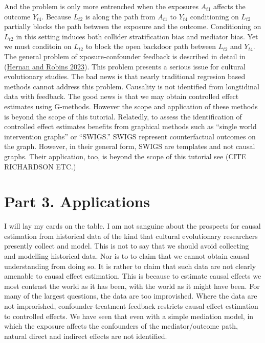 \documentclass[
  singlecolumn]{report}
\begin{document}
And the problem is only more entrenched when the exposures \(A_{t1}\)
affects the outcome \(Y_{t4}\). Because \(L_{t2}\) is along the path
from \(A_{t1}\) to \(Y_{t4}\) conditioning on \(L_{t2}\) partially
blocks the path between the exposure and the outcome. Conditioning on
\(L_{t2}\) in this setting induces both collider stratification bias and
mediator bias. Yet we must conditoin on \(L_{t2}\) to block the open
backdoor path between \(L_{t2}\) and \(Y_{t4}\). The general problem of
xposure-confounder feedback is described in detail in
(\protect\hyperlink{ref-hernan2023}{Hernan and Robins 2023}). This
problem presents a serious issue for cultural evolutionary studies. The
bad news is that nearly traditional regresion based methods cannot
address this problem. Causality is not identified from longtidinal data
with feedback. The good news is that we may obtain controlled effect
estimates using G-methods. However the scope and application of these
methods is beyond the scope of this tutorial. Relatedly, to assess the
identification of controlled effect estimates benefits from graphical
methods such as ``single world intervention graphs'' or ``SWIGS.'' SWIGS
represent counterfactual outcomes on the graph. However, in their
general form, SWIGS are templates and not causal graphs. Their
application, too, is beyond the scope of this tutorial see (CITE
RICHARDSON ETC.)

\hypertarget{part-3.-applications}{%
\section{Part 3. Applications}\label{part-3.-applications}}

I will lay my cards on the table. I am not sanguine about the prospects
for causal estimation from historical data of the kind that cultural
evolutionary researchers presently collect and model. This is not to say
that we should avoid collecting and modelling historical data. Nor is to
to claim that we cannot obtain causal understanding from doing so. It is
rather to claim that such data are not clearly amenable to causal effect
estimation. This is because to estimate causal effects we most contrast
the world as it has been, with the world as it might have been. For many
of the largest questions, the data are too improvished. Where the data
are not improrished, confounder-treatment feedback restricts causal
effect estimation to controlled effects. We have seen that even with a
simple mediation model, in which the exposure affects the confounders of
the mediator/outcome path, natural direct and indirect effects are not
identified.
\end{document}
